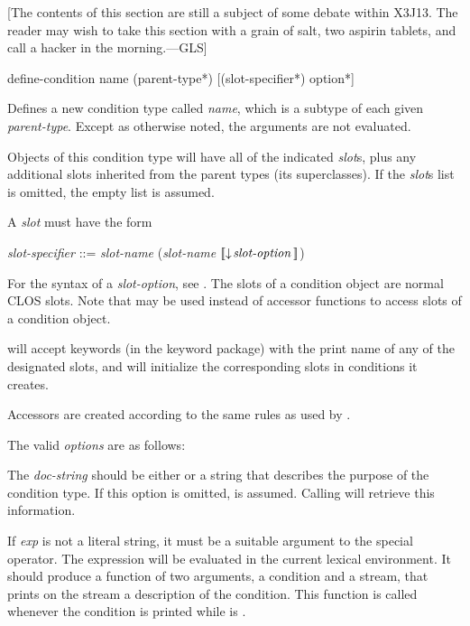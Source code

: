 [The contents of this section are still a subject of some debate within X3J13.
The reader may wish to take this section with a grain of salt, two aspirin
tablets, and call a hacker in the morning.---GLS]

\begin{defmac}
define-condition name ({parent-type}*)
                 [({slot-specifier}*) {option}*]

  Defines a new condition type called \emph{name}, which is a subtype of each given
  \emph{parent-type}.  Except as otherwise noted, the arguments are not evaluated.

  Objects of this condition type will have all of the indicated \emph{slot\/}s, plus
  any additional slots inherited from the parent types (its superclasses).
  If the \emph{slot\/}s list is omitted, the empty list is assumed.

  A \emph{slot} must have the form
\begin{tabbing}
\emph{slot-specifier\/} ::= \emph{slot-name\/} {\Mor} (\emph{slot-name\/}  $\lbrack\!\lbrack\downarrow\!\hbox{\emph{slot-option}}\,\rbrack\!\rbrack$)
\end{tabbing}
For the syntax of a \emph{slot-option}, see .
The slots of a condition object are normal CLOS slots.
Note that  may be used instead of accessor functions to access slots of a
condition object.

   will accept keywords (in the keyword package) with the
  print name of any of the designated slots, and will initialize the
  corresponding slots in conditions it creates.

  Accessors are created according to the same rules as used by .

  The valid \emph{options} are as follows:

\begin{flushdesc}
\item[\cd{(:documentation \emph{doc-string})}]

     The \emph{doc-string} should be either  or
     a string that describes the purpose of the
     condition type. If this option is omitted,  is assumed.
     Calling  will retrieve this information.

\item[\cd{(:report \emph{exp})}]

     If \emph{exp} is not a literal string, it must be a suitable argument to the
      special operator. The expression  will be evaluated
     in the current lexical environment. It should produce a function of two
     arguments, a condition and a stream, that prints on the stream a
     description of the condition. This function is called whenever the
     condition is printed while  is .


\end{flushdesc}
\end{defmac}
